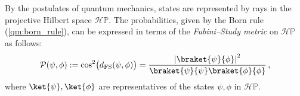     \begin{property}[States]
        By the postulates of quantum mechanics, states are represented by rays in the projective Hilbert space $\mathcal{H}\mathbb{P}$. The probabilities, given by the Born rule (\cref{qm:born_rule}), can be expressed in terms of the \textit{Fubini--Study metric} on $\mathcal{H}\mathbb{P}$ as follows:
        \begin{gather}
            \mathcal{P}(\psi,\phi) := \cos^2\bigl(d_{\text{FS}}(\psi,\phi)\bigr) = \frac{\left|\braket{\psi}{\phi}\right|^2}{\braket{\psi}{\psi}\braket{\phi}{\phi}}\,,
        \end{gather}
        where $\ket{\psi},\ket{\phi}$ are representatives of the states $\psi,\phi$ in $\mathcal{H}\mathbb{P}$.
    \end{property}


